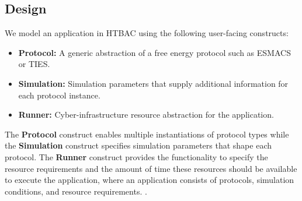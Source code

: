 \subsection{Design}


We model an application in HTBAC using the following user-facing constructs:


\begin{itemize}
  \item \textbf{Protocol:} A generic abstraction of a free energy protocol
  such as ESMACS or TIES.
  \item \textbf{Simulation:} Simulation parameters that supply additional
  information for each protocol instance.
  \item \textbf{Runner:} Cyber-infrastructure resource abstraction for the
  application.
\end{itemize}


The \textbf{Protocol} construct enables multiple instantiations of protocol
types while the \textbf{Simulation} construct specifies simulation parameters
that shape each protocol. The \textbf{Runner} construct provides the
functionality to specify the resource requirements and the amount of time
these resources should be available to execute the application, where an 
application consists of protocols, simulation conditions, and resource 
requirements. 
. 



